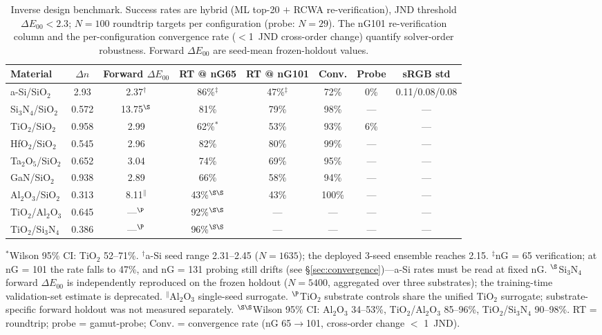 \documentclass[10pt,twocolumn]{article}
\begin{document}
\begin{table}[!b]
\centering
\setlength{\tabcolsep}{3pt}
\caption{Inverse design benchmark. Success rates are hybrid (ML top-20 $+$ RCWA re-verification), JND threshold $\Delta E_{00} < 2.3$; $N=100$ roundtrip targets per configuration (probe: $N=29$). The nG101 re-verification column and the per-configuration convergence rate ($<$1~JND cross-order change) quantify solver-order robustness. Forward $\Delta E_{00}$ are seed-mean frozen-holdout values.}
\scriptsize
\label{tab:benchmark}
\begin{tabular}{@{}lccccccc@{}}
\toprule
Material & $\Delta n$ & Forward $\Delta E_{00}$ & RT @ nG65 & RT @ nG101 & Conv. & Probe & sRGB std \\
\midrule
a-Si/SiO$_2$ & 2.93 & 2.37$^{\dagger}$ & 86\%$^{\ddagger}$ & 47\%$^{\ddagger}$ & 72\% & 0\% & 0.11/0.08/0.08 \\
Si$_3$N$_4$/SiO$_2$ & 0.572 & 13.75$^{\S}$ & 81\% & 79\% & 98\% & --- & --- \\
TiO$_2$/SiO$_2$ & 0.958 & 2.99 & 62\%$^*$ & 53\% & 93\% & 6\% & --- \\
HfO$_2$/SiO$_2$ & 0.545 & 2.96 & 82\% & 80\% & 99\% & --- & --- \\
Ta$_2$O$_5$/SiO$_2$ & 0.652 & 3.04 & 74\% & 69\% & 95\% & --- & --- \\
GaN/SiO$_2$ & 0.938 & 2.89 & 66\% & 58\% & 94\% & --- & --- \\
Al$_2$O$_3$/SiO$_2$ & 0.313 & 8.11$^{\|}$ & 43\%$^{\S\S}$ & 43\% & 100\% & --- & --- \\
\midrule
TiO$_2$/Al$_2$O$_3$ & 0.645 & ---$^{\P}$ & 92\%$^{\S\S}$ & --- & --- & --- & --- \\
TiO$_2$/Si$_3$N$_4$ & 0.386 & ---$^{\P}$ & 96\%$^{\S\S}$ & --- & --- & --- & --- \\
\bottomrule
\end{tabular}

\vspace{2pt}
\raggedright\scriptsize $^*$Wilson 95\% CI: TiO$_2$ 52--71\%. $^{\dagger}$a-Si seed range 2.31--2.45 ($N=1635$); the deployed 3-seed ensemble reaches 2.15. $^{\ddagger}$nG = 65 verification; at nG = 101 the rate falls to 47\%, and nG = 131 probing still drifts (see \S\ref{sec:convergence})---a-Si rates must be read at fixed nG. $^{\S}$Si$_3$N$_4$ forward $\Delta E_{00}$ is independently reproduced on the frozen holdout ($N=5400$, aggregated over three substrates); the training-time validation-set estimate is deprecated. $^{\|}$Al$_2$O$_3$ single-seed surrogate. $^{\P}$TiO$_2$ substrate controls share the unified TiO$_2$ surrogate; substrate-specific forward holdout was not measured separately. $^{\S\S}$Wilson 95\% CI: Al$_2$O$_3$ 34--53\%, TiO$_2$/Al$_2$O$_3$ 85--96\%, TiO$_2$/Si$_3$N$_4$ 90--98\%. RT = roundtrip; probe = gamut-probe; Conv. = convergence rate (nG 65$\to$101, cross-order change $<$ 1~JND).
\end{table}
\end{document}
